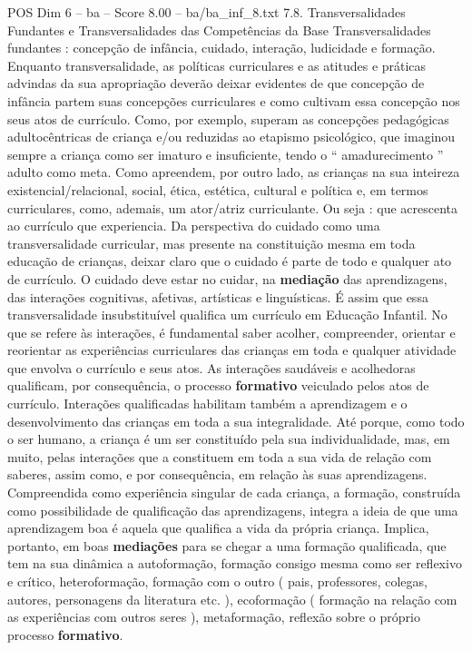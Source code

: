 \begin{textsample}{POS Dim 6 – ba – Score 8.00 – ba/ba\_inf\_8.txt}  \label{ex:f6_pos_078}
7.8.
Transversalidades Fundantes e Transversalidades das Competências da Base Transversalidades fundantes : concepção de infância, cuidado, interação, ludicidade e formação.
Enquanto transversalidade, as políticas curriculares e as atitudes e práticas advindas da sua apropriação deverão deixar evidentes de que concepção de infância partem suas concepções curriculares e como cultivam essa concepção nos seus atos de currículo.
Como, por exemplo, superam as concepções pedagógicas adultocêntricas de criança e/ou reduzidas ao etapismo psicológico, que imaginou sempre a criança como ser imaturo e insuficiente, tendo o “ amadurecimento ” adulto como meta.
Como apreendem, por outro lado, as crianças na sua inteireza existencial/relacional, social, ética, estética, cultural e política e, em termos curriculares, como, ademais, um ator/atriz curriculante.
Ou seja : que acrescenta ao currículo que experiencia.
Da perspectiva do cuidado como uma transversalidade curricular, mas presente na constituição mesma em toda educação de crianças, deixar claro que o cuidado é parte de todo e qualquer ato de currículo.
O cuidado deve estar no cuidar, na \textbf{mediação} das aprendizagens, das interações cognitivas, afetivas, artísticas e linguísticas.
É assim que essa transversalidade insubstituível qualifica um currículo em Educação Infantil.
No que se refere às interações, é fundamental saber acolher, compreender, orientar e reorientar as experiências curriculares das crianças em toda e qualquer atividade que envolva o currículo e seus atos.
As interações saudáveis e acolhedoras qualificam, por consequência, o processo \textbf{formativo} veiculado pelos atos de currículo.
Interações qualificadas habilitam também a aprendizagem e o desenvolvimento das crianças em toda a sua integralidade.
Até porque, como todo o ser humano, a criança é um ser constituído pela sua individualidade, mas, em muito, pelas interações que a constituem em toda a sua vida de relação com saberes, assim como, e por consequência, em relação às suas aprendizagens.
Compreendida como experiência singular de cada criança, a formação, construída como possibilidade de qualificação das aprendizagens, integra a ideia de que uma aprendizagem boa é aquela que qualifica a vida da própria criança.
Implica, portanto, em boas \textbf{mediações} para se chegar a uma formação qualificada, que tem na sua dinâmica a autoformação, formação consigo mesma como ser reflexivo e crítico, heteroformação, formação com o outro ( pais, professores, colegas, autores, personagens da literatura etc. ), ecoformação ( formação na relação com as experiências com outros seres ), metaformação, reflexão sobre o próprio processo \textbf{formativo}.

\end{textsample}

